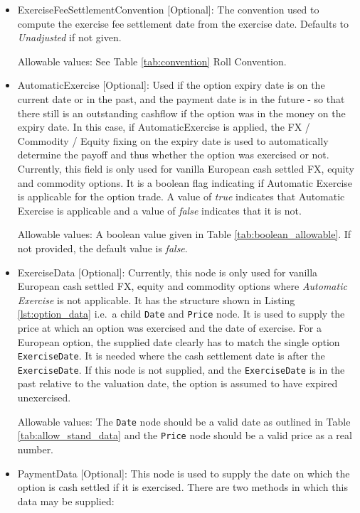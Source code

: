 \begin{itemize}
  Allowable values: See Table \ref{tab:calendar} Calendar.

\item ExerciseFeeSettlementConvention [Optional]: The convention used to compute the exercise fee settlement date from
  the exercise date. Defaults to \emph{Unadjusted} if not given.

  Allowable values: See Table \ref{tab:convention} Roll Convention.

\item AutomaticExercise [Optional]: Used if the option expiry date is on the current date or in the past, and the payment date is in the future  - so that there still is an outstanding cashflow if the option was in the money on the expiry date. In this case, if AutomaticExercise is applied, the FX / Commodity / Equity fixing on the expiry date is used to automatically determine the payoff and thus whether the option was exercised or not.\\
\medskip
Currently, this field is only used for vanilla European cash settled FX, equity and commodity options. It is a boolean flag indicating if Automatic Exercise is applicable for the option trade. A value of \emph{true} indicates that Automatic Exercise is applicable and a value of \emph{false} indicates that it is not.

Allowable values: A boolean value given in Table \ref{tab:boolean_allowable}. If not provided, the default value is \emph{false}.

\item ExerciseData [Optional]: Currently, this node is only used for vanilla European cash settled FX, equity and commodity options where \textit{Automatic Exercise} is not applicable. It has the structure shown in Listing \ref{lst:option_data} i.e.\ a child \lstinline!Date! and \lstinline!Price! node. It is used to supply the price at which an option was exercised and the date of exercise. For a European option, the supplied date clearly has to match the single option \lstinline!ExerciseDate!. It is needed where the cash settlement date is after the \lstinline!ExerciseDate!. If this node is not supplied, and the \lstinline!ExerciseDate! is in the past relative to the valuation date, the option is assumed to have expired unexercised.

Allowable values: The \lstinline!Date! node should be a valid date as outlined in Table \ref{tab:allow_stand_data} and the \lstinline!Price! node should be a valid price as a real number.

\item PaymentData [Optional]:  This node is used to supply the date on which the option is cash settled if it is exercised. There are two methods in which this data may be supplied:


\end{itemize}

